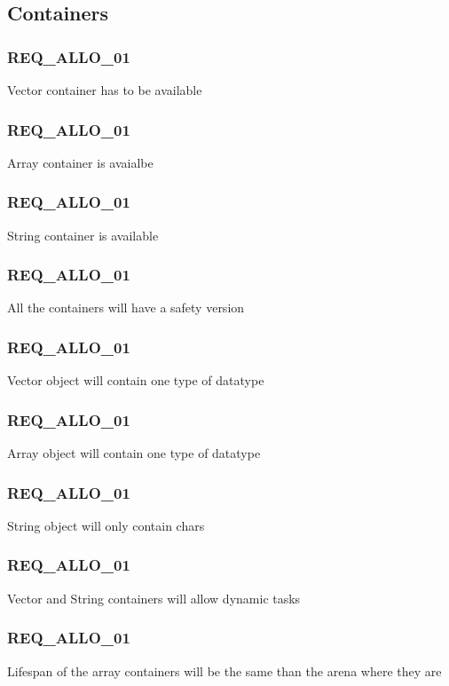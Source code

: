 \documentclass[a4paper,11pt]{article}
\begin{document}
\subsection{Containers}

\subsubsection{REQ\_ALLO\_01}
Vector container has to be available

\subsubsection{REQ\_ALLO\_01}
Array container is avaialbe

\subsubsection{REQ\_ALLO\_01}
String container is available

\subsubsection{REQ\_ALLO\_01}
All the containers will have a safety version

\subsubsection{REQ\_ALLO\_01}
Vector object will contain one type of datatype

\subsubsection{REQ\_ALLO\_01}
Array object will contain one type of datatype

\subsubsection{REQ\_ALLO\_01}
String object will only contain chars

\subsubsection{REQ\_ALLO\_01}
Vector and String containers will allow dynamic tasks

\subsubsection{REQ\_ALLO\_01}
Lifespan of the array containers will be the same than the arena where they are
\end{document}
